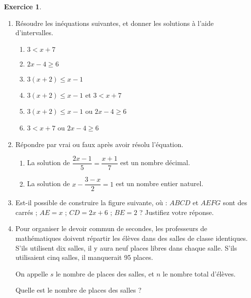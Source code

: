 \documentclass[12pt]{article}
\theoremstyle{definition}
\newtheorem{exercice}{Exercice}
\begin{document}
\setcounter{exercice}{3}
\begin{exercice}~

\begin{enumerate}
  \item Résoudre les inéquations suivantes, et donner les solutions à l'aide d'intervalles.
    \begin{multicols}{2}
      \begin{enumerate}
        \item $3<x+7$
        \item $2x-4\geq6$
        \item $3(x+2)\leq x-1$
        \item $3(x+2)\leq x-1$ et $3<x+7$
        \item $3(x+2)\leq x-1$ ou $2x-4\geq6$
        \item $3<x+7$ ou $2x-4\geq6$
      \end{enumerate}
    \end{multicols}

  \item Répondre par vrai ou faux après avoir résolu l'équation.
    \begin{enumerate}
      \item La solution de $\dfrac{2x-1}{5}=\dfrac{x+1}{7}$ est un nombre décimal.
      \item La solution de $x-\dfrac{3-x}{2}=1$ est un nombre entier naturel.
    \end{enumerate}

  \item Est-il possible de construire la figure suivante, où :
      $ABCD$ et $AEFG$ sont des carrés ;
      $AE=x$ ;
      $CD=2x+6$ ;
      $BE = 2$ ?
    Justifiez votre réponse.

    \begin{center}
    \end{center}

  \item Pour organiser le devoir commun de secondes, les professeurs de
    mathématiques doivent répartir les élèves dans des salles de classe
    identiques. S'ils utilisent dix salles, il y aura neuf places libres dans
    chaque salle. S'ils utilisaient cinq salles, il manquerait 95 places.

    On appelle $s$ le nombre de places des salles, et $n$ le nombre total d'élèves.

    Quelle est le nombre de places des salles ?

\end{enumerate}
\end{exercice}
\end{document}
